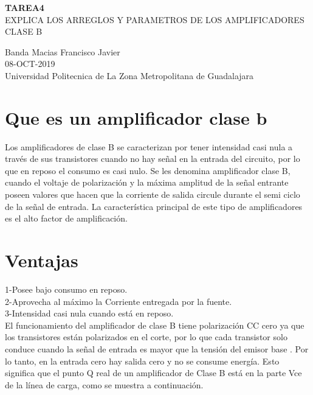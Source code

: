 \documentclass[11pt,a4paper]{article}
\begin{document}
\begin{center}
\textbf{TAREA4}\\
EXPLICA LOS ARREGLOS Y PARAMETROS DE LOS AMPLIFICADORES CLASE B
\end{center}

\begin{center}
Banda Macias Francisco Javier\\
08-OCT-2019\\
Universidad Politecnica de La Zona Metropolitana de Guadalajara
\end{center}


\section{Que es un amplificador clase b}
Los amplificadores de clase B se caracterizan por tener intensidad casi nula a través de sus transistores cuando no hay señal en la entrada del circuito, por lo que en reposo el consumo es casi nulo.
Se les denomina amplificador clase B, cuando el voltaje de polarización y la máxima amplitud de la señal entrante poseen valores que hacen que la corriente de salida circule durante el semi ciclo de la señal de entrada.
La característica principal de este tipo de amplificadores es el alto factor de amplificación.
\section{Ventajas}
       1-Posee bajo consumo en reposo.\\
          2-Aprovecha al máximo la Corriente entregada por la fuente.\\
            3-Intensidad casi nula cuando está en reposo.\\
El funcionamiento del amplificador de clase B tiene polarización CC cero ya que los transistores están polarizados en el corte, por lo que cada transistor solo conduce cuando la señal de entrada es mayor que la tensión del emisor base . Por lo tanto, en la entrada cero hay salida cero y no se consume energía. Esto significa que el punto Q real de un amplificador de Clase B está en la parte Vce de la línea de carga, como se muestra a continuación.
\end{document}
